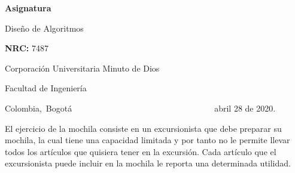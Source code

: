\documentclass[12pt]{article}
\renewcommand{\_}{\kern-1.5pt\textunderscore\kern-1.5pt}
\begin{document}
\begin{Center}
\textbf{Asignatura}
\end{Center}\par

\begin{Center}
Diseño de Algoritmos
\end{Center}\par

\begin{Center}
 
\end{Center}\par

\begin{Center}
\textbf{NRC:} 7487
\end{Center}\par

\begin{Center}
 
\end{Center}\par

\begin{Center}
Corporación Universitaria Minuto de Dios
\end{Center}\par

\begin{Center}
Facultad de Ingeniería
\end{Center}\par

\begin{Center}
Colombia,\ Bogotá\ \ \ \ \ \ \ \ \ \ \ \ \ \ \ \ \ \ \ \ \ \ \ \ \ \ \ \ \ \ \ \ \ \   abril 28 de 2020.
\end{Center}\par


\vspace{\baselineskip}

\vspace{\baselineskip}

\vspace{\baselineskip}

\vspace{\baselineskip}
El ejercicio de la mochila consiste en un excursionista que debe preparar su mochila, la cual tiene una capacidad limitada y por tanto no le permite llevar todos los artículos que quisiera tener en la excursión. Cada artículo que el excursionista puede incluir en la mochila le reporta una determinada utilidad. \par
\end{document}

